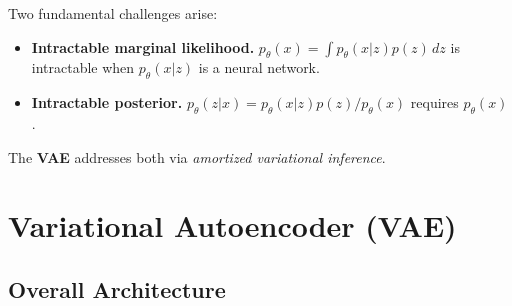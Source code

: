 \documentclass{article}
\begin{document}
Two fundamental challenges arise:
\begin{itemize}
    \item \textbf{Intractable marginal likelihood.} $p_\theta(x) = \int p_\theta(x|z)p(z)\,dz$ is intractable when $p_\theta(x|z)$ is a neural network.
    \item \textbf{Intractable posterior.} $p_\theta(z|x) = p_\theta(x|z)p(z)/p_\theta(x)$ requires $p_\theta(x)$.
\end{itemize}

The \textbf{VAE} addresses both via \emph{amortized variational inference}.

\section{Variational Autoencoder (VAE)}

\subsection{Overall Architecture}
\end{document}
